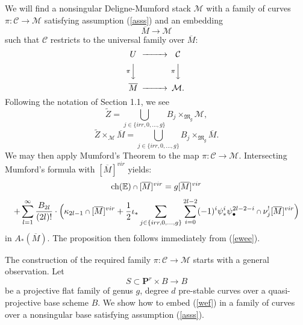 \documentclass[11 pt]{amsart}
\newcommand{\proj}{\mathbf P}
\newcommand{\rarr}{\rightarrow}
\def\scap{\mathbin{\text{\scriptsize$\cap$}}}
\newcommand{\bpf}{\noindent {\em Proof.} }
\newcommand{\hodge}{\mathbb{E}}
\newcommand{\ch}{\text{ch}}
\newcommand{\CM}{\mathcal{M}}
\newcommand{\UM}{\mathcal{C}}
\begin{document}
\bpf We will find a  
nonsingular
Deligne-Mumford stack $\CM$
with a family of curves
$\pi:\UM \rarr \CM$ satisfying assumption (\ref{asss}) and
an embedding 
$$\overline{M} \rarr \CM$$
such that $\UM$ restricts to the universal family over
$\overline{M}$:
\begin{equation*}
\begin{CD}
 U 
@>>>  \UM \\
@V{\pi}VV   @V{\pi}VV \\
 \overline{M} @>>> \CM.
\end{CD}
\end{equation*}
Following the notation of Section 1.1, we see
$$\tilde{Z}= \bigcup_{j\in\{irr,0,\ldots,g\}} B_j \times_{\mathfrak{M}_g}
\CM,$$
$$\tilde{Z} \times_\CM \overline{M} = 
\bigcup_{j\in\{irr,0,\ldots,g\}}
B_j \times_{\mathfrak{M}_g} \overline{M}.$$
We may then apply Mumford's Theorem to the map
$\pi: \UM\rarr \CM$. 
Intersecting Mumford's formula with
$[\overline{M}]^{vir}$ yields:
$$ \ch(\hodge) \scap [\overline{M}]^{vir} = g [\overline{M}]^{vir}$$
$$+ \sum_{l=1}^{\infty} \frac{ B_{2l}}{(2l)!}
\cdot \Big( \kappa_{2l-1} \scap [\overline{M}]^{vir}
 +  
{\frac{1}{2}}\iota_* \sum_{j\in\{irr,0,\ldots,g\}}
 \sum_{i=0}^{2l-2}
(-1)^i \psi_*^i \psi_\bullet^{2l-2-i}
\scap \nu_j^{!} [\overline{M}]^{vir}
\Big)$$
in $A_*(\overline{M})$.
The proposition then follows immediately from (\ref{ewee}).


The construction of the required family $\pi: \UM \rarr \CM$
starts with a general observation.
Let 
\begin{equation}
\label{wef}
S\subset \proj^r \times B \rarr B
\end{equation} 
be a projective flat family of  genus $g$, degree $d$ pre-stable
curves over a quasi-projective base scheme $B$.
We show how to embed (\ref{wef}) in a family of curves
over a nonsingular base satisfying assumption (\ref{asss}).
\end{document}
